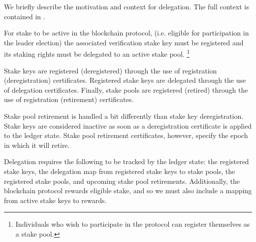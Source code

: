 \newcommand{\AddrRWD}{\type{Addr_{rwd}}}
\newcommand{\DState}{\type{DState}}
\newcommand{\PState}{\type{PState}}

\newcommand{\DCert}{\type{DCert}}
\newcommand{\DCertRegKey}{\type{DCert_{regkey}}}
\newcommand{\DCertDeRegKey}{\type{DCert_{deregkey}}}
\newcommand{\DCertDeleg}{\type{DCert_{delegate}}}
\newcommand{\DCertRegPool}{\type{DCert_{regpool}}}
\newcommand{\DCertRetirePool}{\type{DCert_{retirepool}}}

\newcommand{\RegKey}[1]{\textsc{RegKey}(#1)}
\newcommand{\DeregKey}[1]{\textsc{DeregKey}(#1)}
\newcommand{\Delegate}[1]{\textsc{Delegate}(#1)}
\newcommand{\RegPool}[1]{\textsc{RegPool}(#1)}
\newcommand{\RetirePool}[1]{\textsc{RetirePool}(#1)}
\newcommand{\cauthor}[1]{\fun{author}~ \var{#1}}
\newcommand{\pool}[1]{\fun{pool}~ \var{#1}}
\newcommand{\retire}[1]{\fun{retire}~ \var{#1}}
\newcommand{\addrRw}[1]{\fun{addr_{rwd}}~ \var{#1}}

\newcommand{\emax}{\mathsf{E_{max}}}

We briefly describe the motivation and context for delegation.
The full context is contained in \cite{delegation_design}.

For stake to be active in the blockchain protocol,
(i.e. eligible for participation in the leader election)
the associated verification stake key must be registered
and its staking rights must be delegated to an active stake pool.
\footnote{Individuals who wish to participate in the protocol can
register themselves as a stake pool.}

Stake keys are registered (deregistered) through the use of
registration (deregistration) certificates.
Registered stake keys are delegated through the use of delegation certificates.
Finally, stake pools are registered (retired) through the use of
registration (retirement) certificates.

Stake pool retirement is handled a bit differently than stake key deregistration.
Stake keys are considered inactive as soon as a deregistration certificate
is applied to the ledger state.
Stake pool retirement certificates, however, specify the epoch in
which it will retire.

Delegation requires the following to be tracked by the ledger state:
the registered stake keys, the delegation map from registered stake keys to stake
pools, the registered stake pools, and upcoming stake pool retirements.
Additionally, the blockchain protocol rewards eligible stake, and so we must
also include a mapping from active stake keys to rewards.

